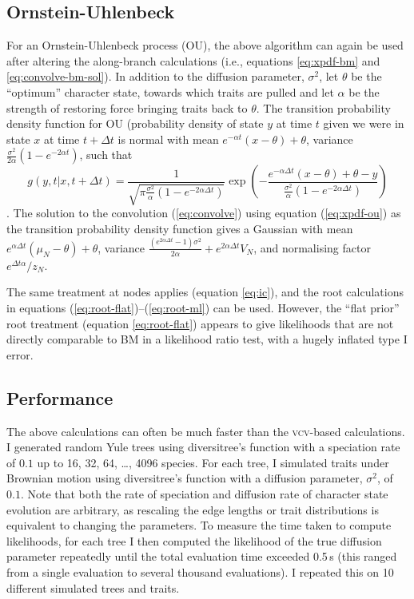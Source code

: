 \documentclass[12pt,twoside]{article}
\newcommand{\dt}{\ensuremath{\Delta t}}
\begin{document}
\subsection{Ornstein-Uhlenbeck}
For an Ornstein-Uhlenbeck process (OU), the above algorithm can again
be used after altering the along-branch calculations (i.e., equations
\ref{eq:xpdf-bm} and \ref{eq:convolve-bm-sol}).
%
In addition to the diffusion parameter, $\sigma^2$, let $\theta$ be
the ``optimum'' character state, towards which traits are pulled and
let $\alpha$ be the strength of restoring force bringing traits back
to $\theta$.
%
The transition probability density function for OU (probability
density of state $y$ at time $t$ given we were in state $x$ at time
$t+\dt$ is normal with mean $e^{-\alpha t}(x - \theta) + \theta$, %
variance $\frac{\sigma^2}{2\alpha}(1-e^{-2\alpha t})$, such that
\begin{equation}
  \label{eq:xpdf-ou}
  g(y,t|x,t+\dt) =
  \frac{1}{\sqrt{\pi\frac{\sigma^2}{\alpha}(1-e^{-2\alpha \dt})}}
  \exp\left(-\frac{e^{-\alpha \dt}(x - \theta) + \theta - y}%
    {\frac{\sigma^2}{\alpha}(1-e^{-2\alpha \dt})}
  \right)
\end{equation}
\citep{Karlin-Taylor}.  The solution to the convolution
(\ref{eq:convolve}) using equation (\ref{eq:xpdf-ou}) as the
transition probability density function gives a Gaussian with %
mean $e^{\alpha \dt} (\mu_N - \theta) + \theta$, %
variance $\frac{(e^{2\alpha\dt} - 1) \sigma^2}{2\alpha} +
e^{2\alpha\dt} V_N$, %
and normalising factor $e^{\dt\alpha}/z_N$.

The same treatment at nodes applies (equation \ref{eq:ic}), and the
root calculations in equations
(\ref{eq:root-flat})--(\ref{eq:root-ml}) can be used.  However, the
``flat prior'' root treatment (equation \ref{eq:root-flat}) appears to
give likelihoods that are not directly comparable to BM in a
likelihood ratio test, with a hugely inflated type I error.

\subsection{Performance}
The above calculations can often be much faster than the
\textsc{vcv}-based calculations.
%
I generated random Yule trees using diversitree's 
function with a speciation rate of $0.1$ up to 16, 32, 64, \ldots,
4096 species.  For each tree, I simulated traits under Brownian motion
using diversitree's  function with a diffusion
parameter, $\sigma^2$, of $0.1$.
% 
Note that both the rate of speciation and diffusion rate of character
state evolution are arbitrary, as rescaling the edge lengths or trait
distributions is equivalent to changing the parameters.
%
To measure the time taken to compute likelihoods, for each tree I then
computed the likelihood of the true diffusion parameter repeatedly
until the total evaluation time exceeded 0.5\,s (this ranged from a
single evaluation to several thousand evaluations).  I repeated this
on 10 different simulated trees and traits.
\end{document}
